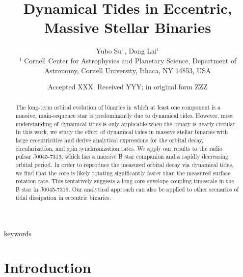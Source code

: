 \documentclass[
        fleqn,
        usenatbib,
    ]{mnras}
\title[Eccentric Dynamical Tides]{Dynamical Tides in Eccentric, Massive Stellar
Binaries}
\author[Y. Su, D. Lai.]{
Yubo Su$^1$,
Dong Lai$^1$
\\
$^1$ Cornell Center for Astrophysics and Planetary Science, Department of
Astronomy, Cornell University, Ithaca, NY 14853, USA
}
\date{Accepted XXX\@. Received YYY\@; in original form ZZZ}
\begin{document}
\label{firstpage}
\pagerange{\pageref{firstpage}--\pageref{lastpage}}
\maketitle

\begin{abstract}
    The long-term orbital evolution of binaries in which at least one component
    is a massive, main-sequence star is predominantly due to dynamical tides.
    However, most understanding of dynamical tides is only applicable when the
    binary is nearly circular. In this work, we study the effect of dynamical
    tides in massive stellar binaries with large eccentricities and derive
    analytical expressions for the orbital decay, circularization, and spin
    synchronization rates. We apply our results to the radio pulsar J0045-7319,
    which has a massive B star companion and a rapidly decreasing orbital
    period. In order to reproduce the measured orbital decay via dynamical
    tides, we find that the core is likely rotating significantly faster than
    the measured surface rotation rate. This tentatively suggests a long
    core-envelope coupling timescale in the B star in J0045-7319. Our analytical
    approach can also be applied to other scenarios of tidal dissipation in
    eccentric binaries.
\end{abstract}

\begin{keywords}
keywords
\end{keywords}

\section{Introduction}


\end{document}
